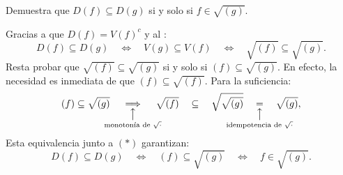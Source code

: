 \begin{ejer}
Demuestra que $D(f)\subseteq D(g)$ si y solo si $f\in\sqrt{(g)}$.
\end{ejer}
\begin{sol}
Gracias a que $D(f)=V(f)^c$ y al :
\[
D(f)\subseteq D(g)
\quad\Longleftrightarrow\quad
V(g)\subseteq V(f)
\quad\Longleftrightarrow\quad
\sqrt{(f)}\subseteq\sqrt{(g)}. \tag{$*$}
\]
Resta probar que $\sqrt{(f)}\subseteq\sqrt{(g)}$ si y solo si $(f)\subseteq\sqrt{(g)}$. En efecto, la necesidad es inmediata de que $(f)\subseteq\sqrt{(f)}$. Para la suficiencia:
\[
(f)\subseteq\sqrt{(g)}%
\quad%
\underset{%
    \mathclap{\substack{%
    \big\uparrow\\\text{monotonía de }\sqrt{\cdot}%
    }}
}{\implies}%
\quad%
\sqrt{(f)} \quad\subseteq\quad \sqrt{\sqrt{(g)}} 
\quad%
\underset{%
    \mathclap{\substack{%
    \big\uparrow\\\text{idempotencia de }\sqrt{\cdot}%
    }}
}{=}%
\quad%
\sqrt{(g)},
\]
Esta equivalencia junto a $(*)$ garantizan:
\[
D(f)\subseteq D(g)
\quad\Longleftrightarrow\quad
(f)\subseteq\sqrt{(g)}
\quad\Longleftrightarrow\quad
f\in\sqrt{(g)}.
\]
\end{sol}